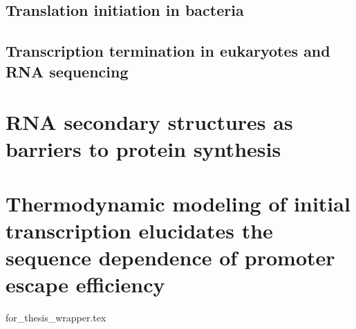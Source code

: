 \documentclass[]{ntnuthesis}
\begin{document}
\section{Translation initiation in bacteria}
\begin{refsection}

\printbibliography
\end{refsection}
\newpage

\begin{refsection}
\section{Transcription termination in eukaryotes and RNA sequencing}



\printbibliography
\end{refsection}
\newpage


\chapter{RNA secondary structures as barriers to protein synthesis}
\begin{refsection}
\label{chap:celB}

\printbibliography
\end{refsection}

\chapter{Thermodynamic modeling of initial transcription elucidates the sequence dependence of promoter escape efficiency}
\begin{refsection}

\label{chap:initiation_paper}
{for_thesis_wrapper.tex}
\printbibliography
\end{refsection}
\end{document}
